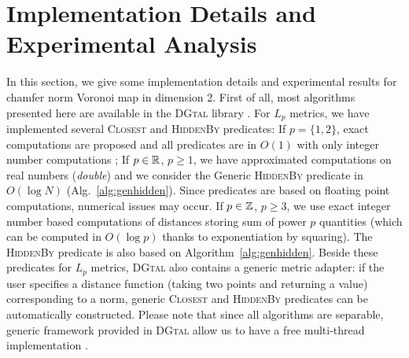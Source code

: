 \documentclass{llncs}
\begin{document}



\section{Implementation Details and Experimental Analysis}
\label{sec:exper-analys}

In this section, we give some implementation details and experimental
results for chamfer norm Voronoi map in dimension 2.  First of all,
most algorithms presented here are available in the \textsc{DGtal}
library \cite{dgtal}. For $L_p$ metrics, we have implemented several
\textsc{Closest} and \textsc{HiddenBy} predicates: If $p=\{1,2\}$,
exact computations are proposed and all predicates are in $O(1)$ with
only integer number computations
\cite{Hirata1996,Maurer2003,roerdnik}; If $p\in {\mathbb{R}}$, $p\geq 1$, we
have approximated computations on real numbers (\emph{double}) and we
consider the Generic \textsc{HiddenBy} predicate in $O(\log N)$
(Alg.~\ref{alg:genhidden}). Since predicates are based on floating
point computations, numerical issues may occur. If $p\in {\mathbb{Z}}$, $p\geq
3$, we use exact integer number based computations of distances
storing sum of power $p$ quantities (which can be computed in
$O(\log{p})$ thanks to exponentiation by squaring). The
\textsc{HiddenBy} predicate is also based on
Algorithm~\ref{alg:genhidden}.
Beside these predicates for $L_p$ metrics, \textsc{DGtal} also
contains a generic metric adapter: if the user specifies a distance
function (taking two points and returning a value) corresponding to a
norm, generic \textsc{Closest} and \textsc{HiddenBy} predicates can be
automatically constructed. Please note that since all algorithms are
separable, generic framework provided in \textsc{DGtal} allow us to
have a free multi-thread implementation \cite{dcoeurjo_ChapDTWADGMM}.
\end{document}
